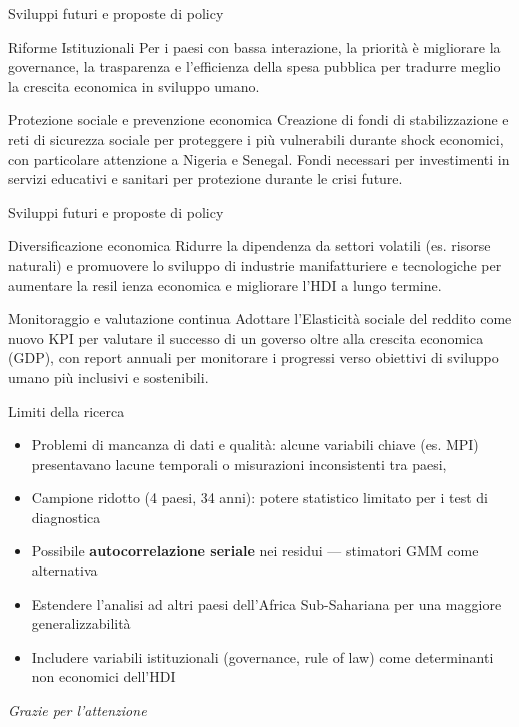 \documentclass[
  ignorenonframetext,
  aspectratio=43,
]{beamer}
\begin{document}
\begin{frame}{Sviluppi futuri e proposte di policy}
\label{sviluppi-futuri-e-proposte-di-policy}
\begin{block}{Riforme Istituzionali}
Per i paesi con bassa interazione, la priorità è migliorare la governance, la trasparenza e l'efficienza della spesa pubblica per tradurre meglio la crescita economica in sviluppo umano.
\end{block}

\begin{block}{Protezione sociale e prevenzione economica}
Creazione di fondi di stabilizzazione e reti di sicurezza sociale per proteggere i più vulnerabili durante shock economici, con particolare attenzione a Nigeria e Senegal.
Fondi necessari per investimenti in servizi educativi e sanitari per protezione durante le crisi future. 
\end{block}
\end{frame}

\begin{frame}{Sviluppi futuri e proposte di policy}
\label{sviluppi-futuri-e-proposte-di-policy-1}
\begin{block}{Diversificazione economica}
Ridurre la dipendenza da settori volatili (es. risorse naturali) e promuovere lo sviluppo di industrie manifatturiere e tecnologiche per aumentare la resil ienza economica e migliorare l'HDI a lungo termine.
\end{block}

\begin{block}{Monitoraggio e valutazione continua}
Adottare l'Elasticità sociale del reddito come nuovo KPI per valutare il successo di un goverso oltre alla crescita economica (GDP), con report annuali per monitorare i progressi verso obiettivi di sviluppo umano più inclusivi e sostenibili.
\end{block}
\end{frame}

\begin{frame}{Limiti della ricerca}
\label{limiti-della-ricerca}
\begin{itemize}
  \item Problemi di mancanza di dati e qualità: alcune variabili chiave (es. MPI) presentavano lacune temporali o misurazioni inconsistenti tra paesi, 
  \item Campione ridotto (4 paesi, 34 anni): potere statistico limitato per i test di diagnostica
  \item Possibile \textbf{autocorrelazione seriale} nei residui — stimatori GMM come alternativa
  \item Estendere l'analisi ad altri paesi dell'Africa Sub-Sahariana per una maggiore generalizzabilità
  \item Includere variabili istituzionali (governance, rule of law) come determinanti non economici dell'HDI
\end{itemize}

\vspace{0.5em}
\begin{center}
\textit{Grazie per l'attenzione}
\end{center}
\end{frame}
\end{document}
